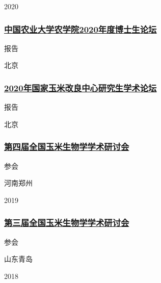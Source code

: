 \documentclass[]{article}
\begin{document}
2020

\hypertarget{ux4e2dux56fdux519cux4e1aux5927ux5b66ux519cux5b66ux96622020ux5e74ux5ea6ux535aux58ebux751fux8bbaux575b}{%
\subsubsection{\texorpdfstring{\href{http://cab.cau.edu.cn/art/2020/10/16/art_23547_711508.html}{中国农业大学农学院2020年度博士生论坛}}{中国农业大学农学院2020年度博士生论坛}}\label{ux4e2dux56fdux519cux4e1aux5927ux5b66ux519cux5b66ux96622020ux5e74ux5ea6ux535aux58ebux751fux8bbaux575b}}

报告

北京

\hypertarget{ux5e74ux56fdux5bb6ux7389ux7c73ux6539ux826fux4e2dux5fc3ux7814ux7a76ux751fux5b66ux672fux8bbaux575b}{%
\subsubsection{\texorpdfstring{\href{http://maizecenter.cau.edu.cn/f/view-4-8481b7bf0f8347509a67269db87ca087.html}{2020年国家玉米改良中心研究生学术论坛}}{2020年国家玉米改良中心研究生学术论坛}}\label{ux5e74ux56fdux5bb6ux7389ux7c73ux6539ux826fux4e2dux5fc3ux7814ux7a76ux751fux5b66ux672fux8bbaux575b}}

报告

北京

\hypertarget{ux7b2cux56dbux5c4aux5168ux56fdux7389ux7c73ux751fux7269ux5b66ux5b66ux672fux7814ux8ba8ux4f1a}{%
\subsubsection{\texorpdfstring{\href{http://www.maizemeeting.org/2019/}{第四届全国玉米生物学学术研讨会}}{第四届全国玉米生物学学术研讨会}}\label{ux7b2cux56dbux5c4aux5168ux56fdux7389ux7c73ux751fux7269ux5b66ux5b66ux672fux7814ux8ba8ux4f1a}}

参会

河南郑州

2019

\hypertarget{ux7b2cux4e09ux5c4aux5168ux56fdux7389ux7c73ux751fux7269ux5b66ux5b66ux672fux7814ux8ba8ux4f1a}{%
\subsubsection{\texorpdfstring{\href{http://www.maizemeeting.org/2018/}{第三届全国玉米生物学学术研讨会}}{第三届全国玉米生物学学术研讨会}}\label{ux7b2cux4e09ux5c4aux5168ux56fdux7389ux7c73ux751fux7269ux5b66ux5b66ux672fux7814ux8ba8ux4f1a}}

参会

山东青岛

2018
\end{document}
